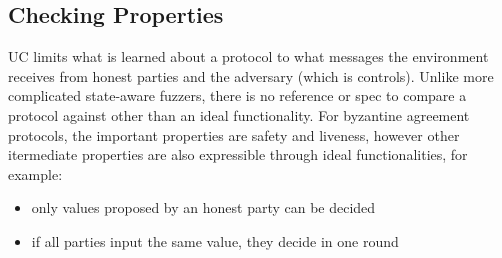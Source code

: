 \subsection{Checking Properties}
UC limits what is learned about a protocol to what messages the environment receives from honest parties and the adversary (which is controls).
Unlike more complicated state-aware fuzzers, there is no reference or spec to compare a protocol against other than an ideal functionality.
For byzantine agreement protocols, the important properties are safety and liveness, however other itermediate properties are also expressible through ideal functionalities, for example:
\begin{itemize}
\item only values proposed by an honest party can be decided
\item if all parties input the same value, they decide in one round 
\end{itemize}
